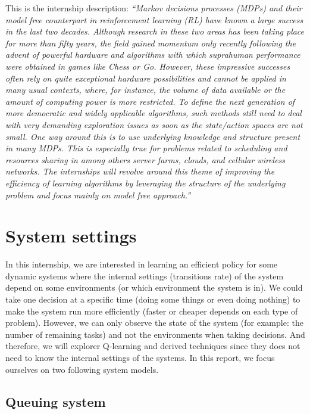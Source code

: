 \documentclass[
  a4paper, xcolor = usenames,dvipsnames]{article}
\theoremstyle{definition}
\theoremstyle{definition}
\theoremstyle{definition}
\theoremstyle{definition}
\theoremstyle{remark}
\begin{document}
This is the internship description: \emph{``Markov decisions processes (MDPs) and their model free counterpart in reinforcement learning (RL) have known a large success in the last two decades. Although research in these two areas has been taking place for more than fifty years, the field gained momentum only recently following the advent of powerful hardware and algorithms with which supra­human performance were obtained in games like Chess or Go. However, these impressive successes often rely on quite exceptional hardware possibilities and cannot be applied in many usual contexts, where, for instance, the volume of data available or the amount of computing power is more restricted. To define the next generation of more democratic and widely applicable algorithms, such methods still need to deal with very demanding exploration issues as soon as the state/action spaces are not small. One way around this is to use underlying knowledge and structure present in many MDPs. This is especially true for problems related to scheduling and resources sharing in among others server farms, clouds, and cellular wireless networks. The internships will revolve around this theme of improving the efficiency of learning algorithms by leveraging the structure of the underlying problem and focus mainly on model ­free approach.''}

\hypertarget{system-settings}{%
\section{System settings}\label{system-settings}}

In this internship, we are interested in learning an efficient policy for some dynamic systems where the internal settings (transitions rate) of the system depend on some environments (or which environment the system is in). We could take one decision at a specific time (doing some things or even doing nothing) to make the system run more efficiently (faster or cheaper depends on each type of problem). However, we can only observe the state of the system (for example: the number of remaining tasks) and not the environments when taking decisions. And therefore, we will explorer Q-learning and derived techniques since they does not need to know the internal settings of the systems. In this report, we focus ourselves on two following system models.

\hypertarget{queuing-system}{%
\subsection{Queuing system}\label{queuing-system}}
\end{document}
